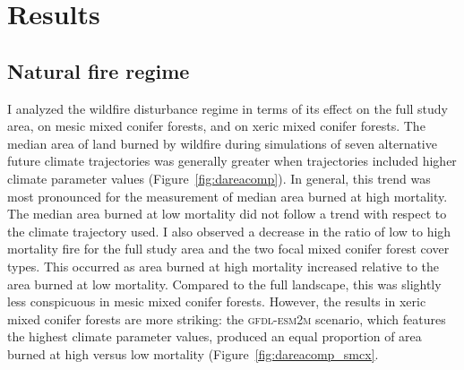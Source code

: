 \section{Results}

\subsection{Natural fire regime}

I analyzed the wildfire disturbance regime in terms of its effect on the full study area, on mesic mixed conifer forests, and on xeric mixed conifer forests. 
%
The median area of land burned by wildfire during simulations of seven alternative future climate trajectories was generally greater when trajectories included higher climate parameter values (Figure~\ref{fig:dareacomp}). In general, this trend was most pronounced for the measurement of median area burned at high mortality. The median area burned at low mortality did not follow a trend with respect to the climate trajectory used. I also observed a decrease in the ratio of low to high mortality fire for the full study area and the two focal mixed conifer forest cover types. This occurred as area burned at high mortality increased relative to the area burned at low mortality. Compared to the full landscape, this was slightly less conspicuous in mesic mixed conifer forests. However, the results in xeric mixed conifer forests are more striking: the \textsc{gfdl-esm2m} scenario, which features the highest climate parameter values, produced an equal proportion of area burned at high versus low mortality (Figure~\ref{fig:dareacomp_smcx}.



